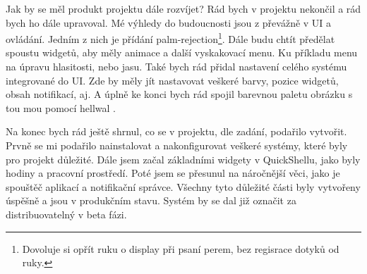 \documentclass[12pt,a4paper]{article}
\begin{document}
Jak by se měl produkt projektu dále rozvíjet? Rád bych v projektu nekončil a rád bych ho dále upravoval. Mé výhledy do budoucnosti jsou z
převážně v UI a ovládání. Jedním z nich je přídání palm-rejection\footnote{Dovoluje si opřít ruku o display při psaní perem, bez regisrace
dotyků od ruky.}. Dále budu chtít předělat spoustu widgetů, aby měly animace a další vyskakovací menu. Ku příkladu menu na úpravu hlasitosti,
nebo jasu. Také bych rád přidal nastavení celého systému integrované do UI. Zde by měly jít nastavovat veškeré barvy, pozice widgetů, obsah
notifikací, aj. A úplně ke konci bych rád spojil barevnou paletu obrázku s tou mou pomocí hellwal \autocite{DanihekHellwalPywallike}.

Na konec bych rád ještě shrnul, co se v projektu, dle zadání, podařilo vytvořit. Prvně se mi podařilo nainstalovat a nakonfigurovat veškeré
systémy, které byly pro projekt důležité. Dále jsem začal základními widgety v QuickShellu, jako byly hodiny a pracovní prostředí. Poté jsem 
se přesunul na náročnější věci, jako je spouštěč aplikací a notifikační správce. Všechny tyto důležité části byly vytvořeny úspěšně a 
jsou v produkčním stavu. Systém by se dal již označit za distribuovatelný v beta fázi.

\newpage
\printbibliography[
heading=bibintoc,
title={Zdroje}
]
\end{document}
